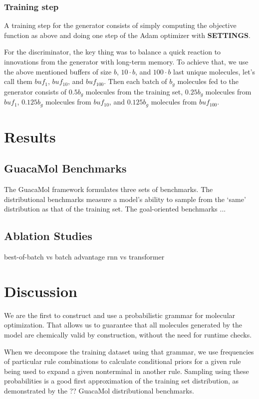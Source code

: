 \documentclass{article}
\begin{document}
\subsubsection{Training step}
A training step for the generator consists of simply computing the objective function as above and doing one step of the Adam optimizer with {\bf SETTINGS}. 

For the discriminator, the key thing was to balance a quick reaction to innovations from the generator with long-term memory. To achieve that, we use the above mentioned buffers of size $b$, $10\cdot b$, and $100\cdot b$ last unique molecules, let's call them $buf_1$, $buf_{10}$, and $buf_{100}$. Then each batch of $b_g$ molecules fed to the generator consists of $0.5 b_g$ molecules from the training set, $0.25 b_g$ molecules from $buf_1$,  $0.125 b_g$ molecules from $buf_{10}$, and  $0.125 b_g$ molecules from $buf_{100}$. 

\section{Results}\label{sec:results}
\subsection{GuacaMol Benchmarks}
The GuacaMol framework formulates three sets of benchmarks. The distributional benchmarks measure a model's ability to sample from the `same' distribution as that of the training set. The goal-oriented benchmarks ...

\subsection{Ablation Studies}
best-of-batch vs batch advantage
rnn vs transformer

\section{Discussion}
We are the first to construct and use a probabilistic grammar for molecular optimization. That allows us to guarantee that all molecules generated by the model are chemically valid by construction, without the need for runtime checks. 

When we decompose the training dataset using that grammar, we use frequencies of particular rule combinations to calculate conditional priors for a given rule being used to expand a given nonterminal in another rule. Sampling using these probabilities is a good first approximation of the training set distribution, as demonstrated by the ?? GuacaMol distributional benchmarks.
\end{document}
